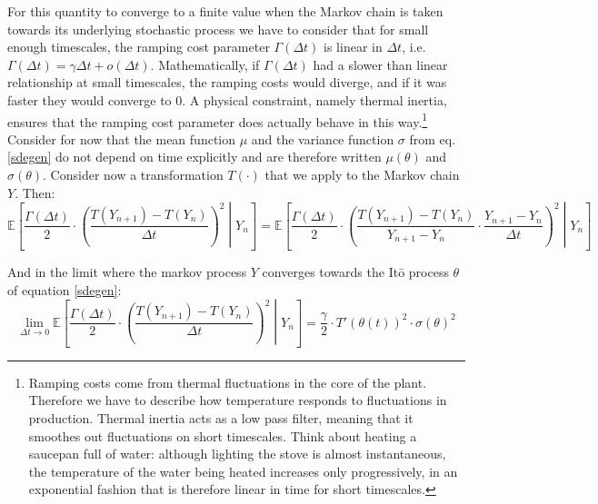 For this quantity to converge to a finite value when the Markov chain is taken towards its underlying stochastic process we have to consider that for small enough timescales, the ramping cost parameter $\Gamma(\Delta t)$ is linear in $\Delta t$, i.e. $\Gamma(\Delta t)=\gamma \Delta t +o(\Delta t)$. Mathematically, if $\Gamma(\Delta t)$ had a slower than linear relationship at small timescales, the ramping costs would diverge, and if it was faster they would converge to $0$. A physical constraint, namely thermal inertia, ensures that the ramping cost parameter does actually behave in this way.\footnote{Ramping costs come from thermal fluctuations in the core of the plant. Therefore we have to describe how temperature responds to fluctuations in production. Thermal inertia acts as a low pass filter, meaning that it smoothes out fluctuations on short timescales. Think about heating a saucepan full of water: although lighting the stove is almost instantaneous, the temperature of the water being heated increases only progressively, in an exponential fashion that is therefore linear in time for short timescales. } \\


Consider for now that the mean function $\mu$ and the variance function $\sigma$ from eq. \ref{sdegen} do not depend on time explicitly and are therefore written $\mu(\theta)$ and $\sigma(\theta)$. Consider now a transformation $T(\cdot)$ that we apply to the Markov chain $Y$. Then:
\begin{equation}
\mathbb{E}\left[\frac{\Gamma(\Delta t)}{2}\cdot\left(\frac{T(Y_{n+1})-T(Y_n)}{\Delta t}\right)^2\middle \vert Y_n  \right]= \mathbb{E}\left[\frac{\Gamma(\Delta t)}{2}\cdot\left(\frac{T(Y_{n+1})-T(Y_n)}{Y_{n+1}-Y_n}\cdot\frac{Y_{n+1}-Y_n}{\Delta t}\right)^2\middle \vert Y_n  \right]    
\label{markovcomposed}
\end{equation}

And in the limit where the markov process $Y$ converges towards the It\={o} process $\theta$ of equation \ref{sdegen}:
\begin{equation}
\lim_{\Delta t \to 0}\mathbb{E}\left[\frac{\Gamma(\Delta t)}{2}\cdot\left(\frac{T(Y_{n+1})-T(Y_n)}{\Delta t}\right)^2\middle \vert Y_n  \right]= \frac{\gamma}{2}\cdot T'(\theta(t))^2 \cdot \sigma(\theta) ^2   
\label{limitmarkovcomposed}
\end{equation}

